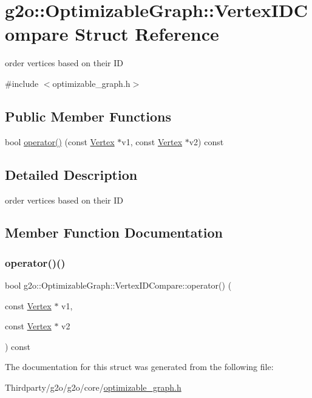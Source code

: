 \hypertarget{structg2o_1_1_optimizable_graph_1_1_vertex_i_d_compare}{}\section{g2o\+:\+:Optimizable\+Graph\+:\+:Vertex\+I\+D\+Compare Struct Reference}
\label{structg2o_1_1_optimizable_graph_1_1_vertex_i_d_compare}


order vertices based on their ID  




{\ttfamily \#include $<$optimizable\+\_\+graph.\+h$>$}

\subsection*{Public Member Functions}
\begin{DoxyCompactItemize}
\item 
bool \mbox{\hyperlink{structg2o_1_1_optimizable_graph_1_1_vertex_i_d_compare_aabbf8cb54cc572189a51fd7353363de9}{operator()}} (const \mbox{\hyperlink{classg2o_1_1_optimizable_graph_1_1_vertex}{Vertex}} $\ast$v1, const \mbox{\hyperlink{classg2o_1_1_optimizable_graph_1_1_vertex}{Vertex}} $\ast$v2) const
\end{DoxyCompactItemize}


\subsection{Detailed Description}
order vertices based on their ID 

\subsection{Member Function Documentation}
\mbox{\label{structg2o_1_1_optimizable_graph_1_1_vertex_i_d_compare_aabbf8cb54cc572189a51fd7353363de9}} 
\subsubsection{\texorpdfstring{operator()()}{operator()()}}
{\footnotesize\ttfamily bool g2o\+::\+Optimizable\+Graph\+::\+Vertex\+I\+D\+Compare\+::operator() (\begin{DoxyParamCaption}\item[{const \mbox{\hyperlink{classg2o_1_1_optimizable_graph_1_1_vertex}{Vertex}} $\ast$}]{v1,  }\item[{const \mbox{\hyperlink{classg2o_1_1_optimizable_graph_1_1_vertex}{Vertex}} $\ast$}]{v2 }\end{DoxyParamCaption}) const\hspace{0.3cm}{\ttfamily [inline]}}



The documentation for this struct was generated from the following file\+:\begin{DoxyCompactItemize}
\item 
Thirdparty/g2o/g2o/core/\mbox{\hyperlink{optimizable__graph_8h}{optimizable\+\_\+graph.\+h}}\end{DoxyCompactItemize}
